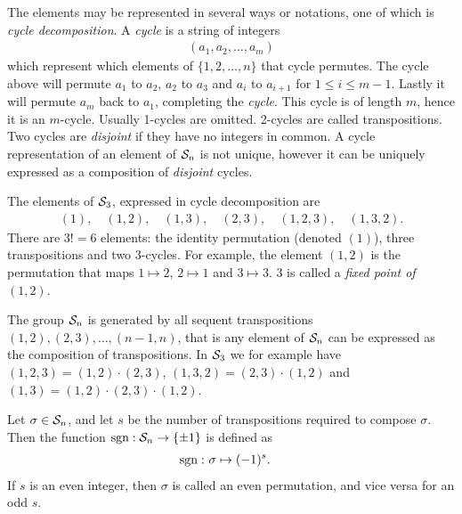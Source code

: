 The elements may be represented in several ways or notations, one of which is \textit{cycle decomposition}. A \textit{cycle} is a string of integers \begin{align*}
	(a_1, a_2, \dots, a_m)
\end{align*} which represent which elements of $\{1,2, \dots, n\}$ that cycle permutes. The cycle above will permute $a_1$ to $a_2$, $a_2$ to $a_3$ and $a_{i}$ to $a_{i+1}$ for $1 \leq i \leq m-1$. Lastly it will permute $a_m$ back to $a_1$, completing the \textit{cycle}. This cycle is of length $m$, hence it is an $m$-cycle. Usually 1-cycles are omitted. 2-cycles are called transpositions. Two cycles are \textit{disjoint} if they have no integers in common. A cycle representation of an element of $\mathcal{S}_n$ is not unique, however it can be uniquely expressed as a composition of \textit{disjoint} cycles.

\begin{example}
	The elements of $\mathcal{S}_3$, expressed in cycle decomposition are
	\begin{align*}
		(1),\quad (1,2), \quad(1,3), \quad(2,3), \quad(1,2,3), \quad(1,3,2).
	\end{align*}
	There are $3! = 6$ elements: the identity permutation (denoted $(1)$), three transpositions and two 3-cycles. For example, the element $(1,2)$ is the permutation that maps $1 \mapsto 2$, $2 \mapsto 1$ and $3 \mapsto 3$. 3 is called a \textit{fixed point of $(1,2)$}.
\end{example}

\begin{note}
	The group $\mathcal{S}_n$ is generated by all sequent transpositions $(1,2), (2,3), \dots, (n-1,n)$, that is any element of $\mathcal{S}_n$ can be expressed as the composition of transpositions. In $\mathcal{S}_3$ we for example have $(1,2,3) = (1,2)\cdot(2,3)$, $(1,3,2) = (2,3)\cdot(1,2)$ and $(1,3) = (1,2)\cdot(2,3)\cdot(1,2)$.
\end{note}

\begin{definition}
	Let $\sigma \in \mathcal{S}_n$, and let $s$ be the number of transpositions required to compose $\sigma$. Then the function $\text{sgn}: \mathcal{S}_n \rightarrow \{\pm 1\}$ is defined as
	\begin{align*}
		\text{sgn}: & \ \sigma \mapsto (-1)^s.
	\end{align*}
	If $s$ is an even integer, then $\sigma$ is called an even permutation, and vice versa for an odd $s$.
\end{definition}

